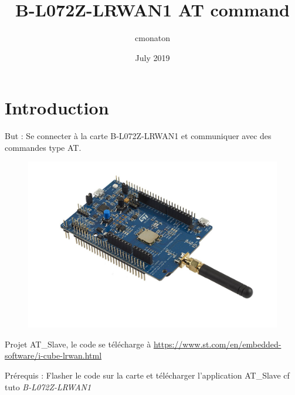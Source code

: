 \documentclass{article}
\title{B-L072Z-LRWAN1 AT command}
\author{cmonaton }
\date{July 2019}
\begin{document}
\maketitle

\section{Introduction}
But : Se connecter à la carte B-L072Z-LRWAN1 et communiquer avec des commandes type AT. \\

\begin{figure}[H]
\begin{center}
\advance\leftskip-3cm
\advance\rightskip-3cm
\includegraphics[keepaspectratio=true,scale=0.5]{carte.jpeg}
\label{visina8}
\end{center}\end{figure}


Projet AT\_Slave, le code se télécharge à  \url{https://www.st.com/en/embedded-software/i-cube-lrwan.html}

Prérequis : Flasher le code sur la carte et télécharger l'application AT\_Slave cf tuto \textit{B-L072Z-LRWAN1}

\end{document}
